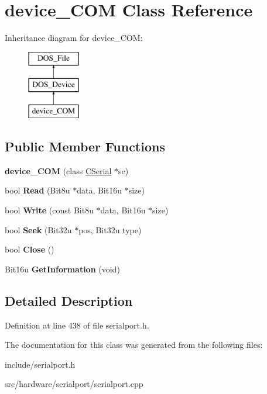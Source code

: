 \hypertarget{classdevice__COM}{\section{device\-\_\-\-C\-O\-M Class Reference}
\label{classdevice__COM}
}
Inheritance diagram for device\-\_\-\-C\-O\-M\-:\begin{figure}[H]
\begin{center}
\leavevmode
\includegraphics[height=3.000000cm]{classdevice__COM}
\end{center}
\end{figure}
\subsection*{Public Member Functions}
\begin{DoxyCompactItemize}
\item 
\hypertarget{classdevice__COM_a27121b64d7af922b43f2a440845f5f30}{{\bfseries device\-\_\-\-C\-O\-M} (class \hyperlink{classCSerial}{C\-Serial} $\ast$sc)}\label{classdevice__COM_a27121b64d7af922b43f2a440845f5f30}

\item 
\hypertarget{classdevice__COM_a1c1ae4216213b38d8df250b8a620d11d}{bool {\bfseries Read} (Bit8u $\ast$data, Bit16u $\ast$size)}\label{classdevice__COM_a1c1ae4216213b38d8df250b8a620d11d}

\item 
\hypertarget{classdevice__COM_abc6d2c0711908166b5e41e3028c37dd4}{bool {\bfseries Write} (const Bit8u $\ast$data, Bit16u $\ast$size)}\label{classdevice__COM_abc6d2c0711908166b5e41e3028c37dd4}

\item 
\hypertarget{classdevice__COM_a6532f789b0eb77a8d821b7ebc8923edc}{bool {\bfseries Seek} (Bit32u $\ast$pos, Bit32u type)}\label{classdevice__COM_a6532f789b0eb77a8d821b7ebc8923edc}

\item 
\hypertarget{classdevice__COM_a5d00c77725eba731dc7d766d2746ccd3}{bool {\bfseries Close} ()}\label{classdevice__COM_a5d00c77725eba731dc7d766d2746ccd3}

\item 
\hypertarget{classdevice__COM_a0f83ae83d1102e5191189983a18e8766}{Bit16u {\bfseries Get\-Information} (void)}\label{classdevice__COM_a0f83ae83d1102e5191189983a18e8766}

\end{DoxyCompactItemize}


\subsection{Detailed Description}


Definition at line 438 of file serialport.\-h.



The documentation for this class was generated from the following files\-:\begin{DoxyCompactItemize}
\item 
include/serialport.\-h\item 
src/hardware/serialport/serialport.\-cpp\end{DoxyCompactItemize}
